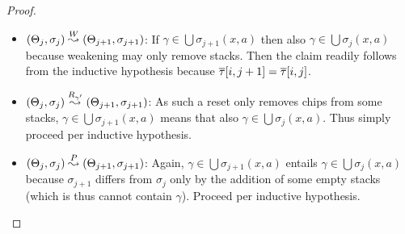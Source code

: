 \begin{proof}
\begin{itemize}
  \item $(\Theta_j, \sigma_j) \stackrel{W}{\leadsto} (\Theta_{j + 1}, \sigma_{j + 1})$: If
    $\gamma \in \bigcup \sigma_{j + 1}(x, a)$ then also $\gamma \in \bigcup
    \sigma_{j}(x, a)$ because weakening may only remove stacks. Then the claim
    readily follows from the inductive hypothesis because $\overline{\tau}[i, j + 1] =
    \overline{\tau}[i, j]$.
  \item $(\Theta_j, \sigma_j) \stackrel{R_{\gamma'}}{\leadsto} (\Theta_{j + 1}, \sigma_{j + 1})$:
    As such a reset only removes chips from some stacks, $\gamma \in \bigcup
    \sigma_{j + 1}(x, a)$ means that also $\gamma \in \bigcup \sigma_{j}(x, a)$.
    Thus simply proceed per inductive hypothesis.
  \item $(\Theta_j, \sigma_j) \stackrel{P}{\leadsto} (\Theta_{j + 1}, \sigma_{j + 1})$:
    Again, $\gamma \in \bigcup \sigma_{j + 1}(x, a)$ entails $\gamma \in \bigcup
    \sigma_{j}(x, a)$ because $\sigma_{j + 1}$ differs from $\sigma_j$ only by
    the addition of some empty stacks (which is thus cannot contain $\gamma$).
    Proceed per inductive hypothesis.
  \end{itemize}


\end{proof}
